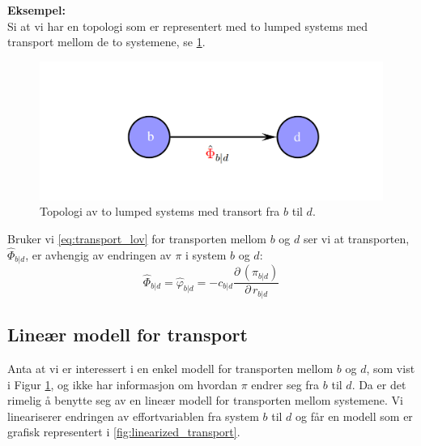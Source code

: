 \textbf{Eksempel:}\\
Si at vi har en topologi som er representert med to lumped systems med transport mellom de to systemene, se \cref{fig:transport_topologi1}. 

\begin{figure}[H]
    \centering
    \includegraphics[scale=0.3]{Figures/Transport_topologi.png}
    \caption{Topologi av to lumped systems med transort fra $b$ til $d$.}
    \label{fig:transport_topologi1}
\end{figure}

Bruker vi \cref{eq:transport_lov} for transporten mellom $b$ og $d$ ser vi at transporten, $\hat{\Phi}_{b|d}$, er avhengig av endringen av $\pi$ i system $b$ og $d$: 
\begin{equation}
\hat{\Phi}_{b|d} = \hat{\varphi}_{b|d} = -c_{b|d}\frac{\partial \,( \pi_{b|d})}{\partial \, r_{b|d}}
\end{equation}

\subsection{Lineær modell for transport}\label{sec:linear_transport}
Anta at vi er interessert i en enkel modell for transporten mellom $b$ og $d$, som vist i Figur \ref{fig:transport_topologi1}, og ikke har informasjon om hvordan $\pi$ endrer seg fra $b$ til $d$. Da er det rimelig å benytte seg av en lineær modell for transporten mellom systemene. Vi lineariserer endringen av effortvariablen fra system $b$ til $d$ og får en modell som er grafisk representert i \cref{fig:linearized_transport}. 

